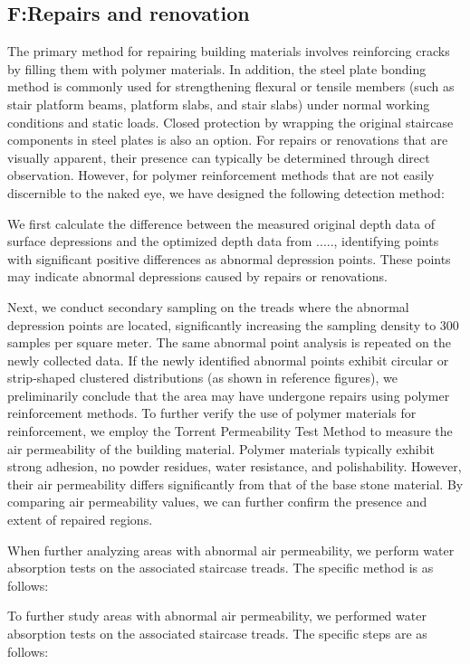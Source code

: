 \documentclass{mcmthesis}
\begin{document}
\subsection{F:Repairs and renovation}

The primary method for repairing building materials involves reinforcing cracks by filling them with polymer materials\cite{ YTLX200401034}. In addition, the steel plate bonding method is commonly used for strengthening flexural or tensile members (such as stair platform beams, platform slabs, and stair slabs) under normal working conditions and static loads. Closed protection by wrapping the original staircase components in steel plates is also an option.
For repairs or renovations that are visually apparent, their presence can typically be determined through direct observation. However, for polymer reinforcement methods that are not easily discernible to the naked eye, we have designed the following detection method:

We first calculate the difference between the measured original depth data of surface depressions and the optimized depth data from ....., identifying points with significant positive differences as abnormal depression points. These points may indicate abnormal depressions caused by repairs or renovations.

Next, we conduct secondary sampling on the treads where the abnormal depression points are located, significantly increasing the sampling density to 300 samples per square meter. The same abnormal point analysis is repeated on the newly collected data. If the newly identified abnormal points exhibit circular or strip-shaped clustered distributions (as shown in reference figures), we preliminarily conclude that the area may have undergone repairs using polymer reinforcement methods.
To further verify the use of polymer materials for reinforcement, we employ the Torrent Permeability Test Method to measure the air permeability of the building material\cite{sena2015non}. Polymer materials typically exhibit strong adhesion, no powder residues, water resistance, and polishability. However, their air permeability differs significantly from that of the base stone material. By comparing air permeability values, we can further confirm the presence and extent of repaired regions.

When further analyzing areas with abnormal air permeability, we perform water absorption tests on the associated staircase treads. The specific method is as follows:

To further study areas with abnormal air permeability, we performed water absorption tests on the associated staircase treads. The specific steps are as follows:
\end{document}
